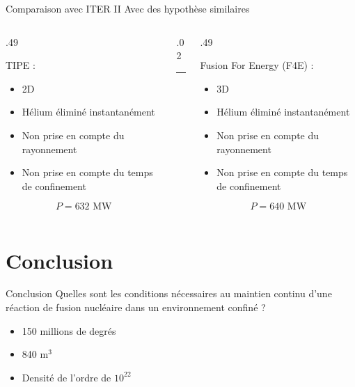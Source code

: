 \documentclass{beamer}
\begin{document}
\begin{frame}{Comparaison avec ITER II}
    Avec des hypothèse similaires
    \begin{columns}
        \begin{column}{.49\textwidth}
            \begin{center}
                TIPE :
            \end{center}
            \begin{itemize}
                \item 2D
                \item Hélium éliminé instantanément
                \item Non prise en compte du rayonnement
                \item Non prise en compte du temps de confinement
            \end{itemize}
            \[ P = 632\text{ MW} \]
        \end{column}
        \begin{column}{.02\textwidth}
            \rule{.1mm}{0.65\textheight}
        \end{column}
        \begin{column}{.49\textwidth}
            \begin{center}
                Fusion For Energy (F4E) :
            \end{center}
            \begin{itemize}
                \item 3D
                \item Hélium éliminé instantanément
                \item Non prise en compte du rayonnement
                \item Non prise en compte du temps de confinement
            \end{itemize}
            \[ P = 640\text{ MW} \]
        \end{column}
    \end{columns}
\end{frame}

\section{Conclusion}

\begin{frame}{Conclusion}
    Quelles sont les conditions nécessaires au maintien continu d’une réaction de fusion nucléaire dans un environnement confiné ?\medskip
    \begin{itemize}
        \item 150 millions de degrés
        \item 840 m$^3$
        \item Densité de l'ordre de $10^{22}$
    \end{itemize}
\end{frame}
\end{document}
